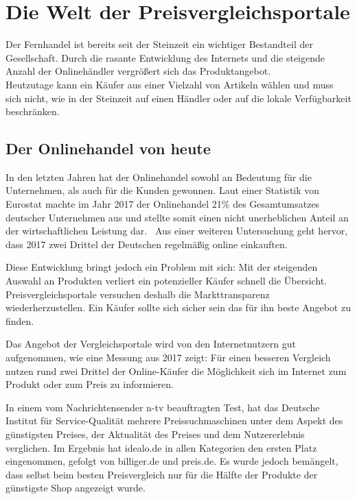 \section{Die Welt der Preisvergleichsportale}
\label{sec:einleitung}

Der Fernhandel ist bereits seit der Steinzeit ein wichtiger Bestandteil der Gesellschaft.
Durch die rasante Entwicklung des Internets und die steigende Anzahl der Onlinehändler vergrößert sich das
Produktangebot.\\
Heutzutage kann ein Käufer aus einer Vielzahl von Artikeln wählen und muss sich nicht, wie in der Steinzeit auf
einen Händler oder auf die lokale Verfügbarkeit beschränken.

\subsection{Der Onlinehandel von heute}
\label{subsec:onlinehandel-heute}

In den letzten Jahren hat der Onlinehandel sowohl an Bedeutung für die Unternehmen, als auch für die Kunden gewonnen.
Laut einer Statistik von Eurostat machte im Jahr 2017 der Onlinehandel 21\% des Gesamtumsatzes deutscher Unternehmen
aus und stellte somit einen nicht unerheblichen Anteil an der wirtschaftlichen Leistung
dar.~\cite{statista:anteil-gesamtumsatz-europa}
Aus einer weiteren Untersuchung geht hervor, dass 2017 zwei Drittel der Deutschen regelmäßig online
einkauften.~\cite{statista:anteil-online-kaeufer-europa}

Diese Entwicklung bringt jedoch ein Problem mit sich: Mit der steigenden Auswahl an Produkten verliert ein
potenzieller Käufer schnell die Übersicht.
Preisvergleichsportale versuchen deshalb die Markttransparenz wiederherzustellen.
Ein Käufer sollte sich sicher sein das für ihn beste Angebot zu finden.

Das Angebot der Vergleichsportale wird von den Internetnutzern gut aufgenommen, wie eine Messung aus 2017 zeigt:
Für einen besseren Vergleich nutzen rund zwei Drittel der Online-Käufer die Möglichkeit sich im Internet zum Produkt
oder zum Preis zu informieren.~\cite{statista:internetnutzer-preisvergleich-deutschland,
statista:anteil-online-kaeufe-deutschland}

In einem vom Nachrichtensender n-tv beauftragten Test\footnotemark, hat das Deutsche Institut für Service-Qualität
mehrere Preissuchmaschinen unter dem Aspekt des günstigsten Preises, der Aktualität des Preises und dem
Nutzererlebnis verglichen.
\newline
Im Ergebnis hat idealo.de in allen Kategorien den ersten Platz eingenommen, gefolgt von billiger.de und preis.de.
Es wurde jedoch bemängelt, dass selbst beim besten Preisvergleich nur für die Hälfte der Produkte der günstigste
Shop angezeigt wurde.

